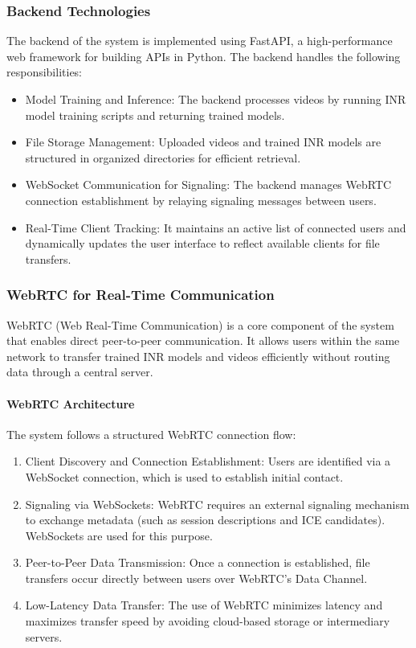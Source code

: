 \subsubsection{Backend Technologies}

The backend of the system is implemented using FastAPI, a high-performance web framework for building APIs in Python. The backend handles the following responsibilities:

\begin{itemize}
    \item Model Training and Inference: The backend processes videos by running INR model training scripts and returning trained models.
    \item File Storage Management: Uploaded videos and trained INR models are structured in organized directories for efficient retrieval.
    \item WebSocket Communication for Signaling: The backend manages WebRTC connection establishment by relaying signaling messages between users.
    \item Real-Time Client Tracking: It maintains an active list of connected users and dynamically updates the user interface to reflect available clients for file transfers.
\end{itemize}

\subsubsection{WebRTC for Real-Time Communication}

WebRTC (Web Real-Time Communication) is a core component of the system that enables direct peer-to-peer communication. It allows users within the same network to transfer trained INR models and videos efficiently without routing data through a central server.

\paragraph{WebRTC Architecture}

The system follows a structured WebRTC connection flow:

\begin{enumerate}
    \item Client Discovery and Connection Establishment: Users are identified via a WebSocket connection, which is used to establish initial contact.
    \item Signaling via WebSockets: WebRTC requires an external signaling mechanism to exchange metadata (such as session descriptions and ICE candidates). WebSockets are used for this purpose.
    \item Peer-to-Peer Data Transmission: Once a connection is established, file transfers occur directly between users over WebRTC's Data Channel.
    \item Low-Latency Data Transfer: The use of WebRTC minimizes latency and maximizes transfer speed by avoiding cloud-based storage or intermediary servers.
\end{enumerate}

